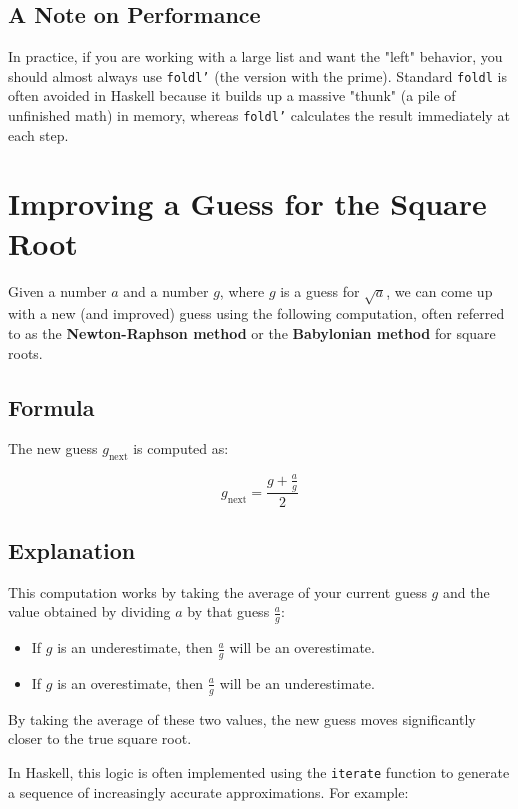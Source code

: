 \documentclass[12pt]{article}
\begin{document}
\subsection*{A Note on Performance}
In practice, if you are working with a large list and want the "left" behavior, you should almost always use \texttt{foldl'} (the version with the prime). Standard \texttt{foldl} is often avoided in Haskell because it builds up a massive "thunk" (a pile of unfinished math) in memory, whereas \texttt{foldl'} calculates the result immediately at each step.


\section{Improving a Guess for the Square Root}

Given a number $a$ and a number $g$, where $g$ is a guess for $\sqrt{a}$, we can come up with a new (and improved) guess using the following computation, often referred to as the \textbf{Newton-Raphson method} or the \textbf{Babylonian method} for square roots.

\subsection{Formula}

The new guess $g_{\text{next}}$ is computed as:

\[
    g_{\text{next}} = \frac{g + \frac{a}{g}}{2}
\]

\subsection{Explanation}

This computation works by taking the average of your current guess $g$ and the value obtained by dividing $a$ by that guess $\frac{a}{g}$:

\begin{itemize}
    \item If $g$ is an underestimate, then $\frac{a}{g}$ will be an overestimate.
    \item If $g$ is an overestimate, then $\frac{a}{g}$ will be an underestimate.
\end{itemize}

By taking the average of these two values, the new guess moves significantly closer to the true square root.

In Haskell, this logic is often implemented using the \texttt{iterate} function to generate a sequence of increasingly accurate approximations. For example:
\end{document}
